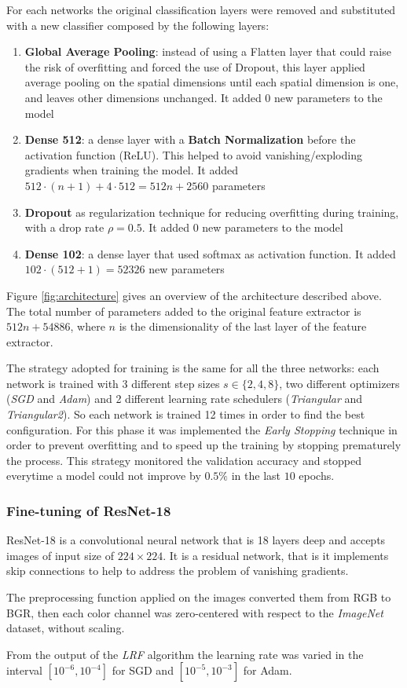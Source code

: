 For each networks the original classification layers were removed and substituted with a new classifier composed by the following layers:
\begin{enumerate}
\item{\textbf{Global Average Pooling}: instead of using a Flatten layer that could raise the risk of overfitting and forced the use of Dropout, this layer applied average pooling on the spatial dimensions until each spatial dimension is one, and leaves other dimensions unchanged. It added 0 new parameters to the model} 
\item{\textbf{Dense 512}: a dense layer with a \textbf{Batch Normalization} before the activation function (ReLU). This helped to avoid vanishing/exploding gradients when training the model. It added $512 \cdot (n+1) + 4\cdot512 = 512n + 2560$ parameters}
\item{\textbf{Dropout} as regularization technique for reducing overfitting during training, with a drop rate $\rho=0.5$. It added 0 new parameters to the model}
\item{\textbf{Dense 102}: a dense layer that used softmax as activation function. It added  $102 \cdot (512+1) = 52326$ new parameters}
\end{enumerate}
Figure \ref{fig:architecture} gives an overview of the architecture described above.
The total number of parameters added to the original feature extractor is $512n + 54886$, where $n$ is the dimensionality of the last layer of the feature extractor.\par
The strategy adopted for training is the same for all the three networks: each network is trained with 3 different step sizes $s \in \{2,4,8\}$, two different optimizers (\textit{SGD} and \textit{Adam}) and 2 different learning rate schedulers (\emph{Triangular} and \emph{Triangular2}). So each network is trained 12 times in order to find the best configuration. For this phase it was implemented the \textit{Early Stopping} technique in order to prevent overfitting and to speed up the training by stopping prematurely the process. This strategy monitored the validation accuracy and stopped everytime a model could not improve by $0.5\%$ in the last $10$ epochs.



\subsubsection{Fine-tuning of ResNet-18}\label{sec:resnet18}
ResNet-18 is a convolutional neural network that is 18 layers deep and accepts images of input size of $224 \times 224$. It is a residual network, that is it implements skip connections to help to address the problem of vanishing  gradients. \par
The preprocessing function applied on the images converted them from RGB to BGR, then each color channel was zero-centered with respect to the \textit{ImageNet} dataset, without scaling. \par
From the output of the \textit{LRF} algorithm the learning rate was varied in the interval $[10^{-6}, 10^{-4}]$ for SGD and $[10^{-5}, 10^{-3}]$ for Adam.


